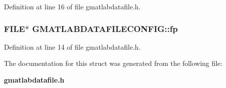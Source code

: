 Definition at line 16 of file gmatlabdatafile.h.
\subsubsection[{fp}]{\setlength{\rightskip}{0pt plus 5cm}FILE$\ast$ {\bf GMATLABDATAFILECONFIG::fp}}\label{structGMATLABDATAFILECONFIG_a900bde88d01e7b5380101446c89a06a6}


Definition at line 14 of file gmatlabdatafile.h.

The documentation for this struct was generated from the following file:\begin{DoxyCompactItemize}
\item 
{\bf gmatlabdatafile.h}\end{DoxyCompactItemize}
